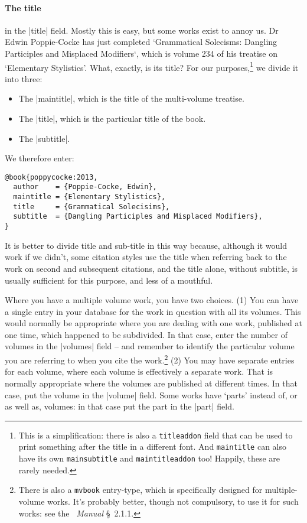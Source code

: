 \paragraph{The title} in the |title| field. Mostly this is easy, but
some works exist to annoy us. Dr Edwin Poppie-Cocke has just completed
`Grammatical Solecisms: Dangling Participles and Misplaced Modifiers`,
which is volume 234 of his treatise on `Elementary Stylistics'. What,
exactly, is its title? For our purposes,\footnote{This is a
  simplification: there is also a \texttt{titleaddon} field that can
  be used to print something after the title in a different font. And
  \texttt{maintitle} can also have its own \texttt{mainsubtitle} and
  \texttt{maintitleaddon} too! Happily, these are rarely needed.} we
divide it into three:
\begin{itemize}
\item The |maintitle|, which is the title of the multi-volume
  treatise.
\item The |title|, which is the particular title of the book.
\item The |subtitle|.
\end{itemize}
We therefore enter:
\begin{Verbatim}
@book{poppycocke:2013,
  author    = {Poppie-Cocke, Edwin},
  maintitle = {Elementary Stylistics},
  title     = {Grammatical Solecisims},
  subtitle  = {Dangling Participles and Misplaced Modifiers},
}
\end{Verbatim}
It is better to divide title and sub-title in this way because,
although it would work if we didn't, some citation styles use the
title when referring back to the work on second and subsequent
citations, and the title alone, without subtitle, is usually
sufficient for this purpose, and less of a mouthful.

Where you have a multiple volume work, you have two choices. (1) You
can have a single entry in your database for the work in question with
all its volumes. This would normally be appropriate where you are
dealing with one work, published at one time, which happened to be
subdivided. In that case, enter the number of volumes in the |volumes|
field -- and remember to identify the particular volume you are
referring to when you cite the work.\footnote{There is also a
  \texttt{mvbook} entry-type, which is specifically designed for
  multiple-volume works. It's probably better, though not compulsory,
  to use it for such works: see the \biblatex\ \emph{Manual}
  \S~2.1.1.} (2) You may have separate entries for each volume, where
each volume is effectively a separate work. That is normally
appropriate where the volumes are published at different times. In
that case, put the volume in the |volume| field. Some works have
`parts' instead of, or as well as, volumes: in that case put the part
in the |part| field.

